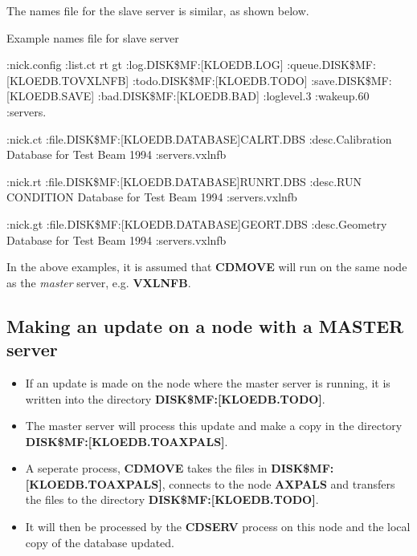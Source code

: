 The names file for the slave server is similar, as shown below.

\begin{XMPt}{Example names file for slave server}

:nick.config
:list.ct rt gt
:log.DISK\$MF:[KLOEDB.LOG]
:queue.DISK\$MF:[KLOEDB.TOVXLNFB]
:todo.DISK\$MF:[KLOEDB.TODO]
:save.DISK\$MF:[KLOEDB.SAVE]
:bad.DISK\$MF:[KLOEDB.BAD]
:loglevel.3
:wakeup.60
:servers.

:nick.ct
:file.DISK\$MF:[KLOEDB.DATABASE]CALRT.DBS
:desc.Calibration Database for Test Beam 1994
:servers.vxlnfb

:nick.rt
:file.DISK\$MF:[KLOEDB.DATABASE]RUNRT.DBS
:desc.RUN CONDITION Database for Test Beam 1994
:servers.vxlnfb

:nick.gt
:file.DISK\$MF:[KLOEDB.DATABASE]GEORT.DBS
:desc.Geometry Database for Test Beam 1994
:servers.vxlnfb

\end{XMPt}

In the above examples, it is assumed that {\bf CDMOVE} will run on the 
same node as the {\it master} server, e.g. {\bf VXLNFB}.

\subsection{Making an update on a node with a {\bf MASTER} server}
\begin{itemize}
\item
If an update is made on the node where the master server is running,
it is written into the directory {\bf DISK\$MF:[KLOEDB.TODO]}. 
\item
The master server will process this update and make a copy in the directory
{\bf DISK\$MF:[KLOEDB.TOAXPALS]}. 
\item
A seperate process, {\bf CDMOVE} takes the files in 
{\bf DISK\$MF:[KLOEDB.TOAXPALS]}, connects to the node {\bf AXPALS}
and transfers the files to the directory
{\bf DISK\$MF:[KLOEDB.TODO]}. 
\item
It will then be processed by the
{\bf CDSERV} process on this node and the local copy of the 
database updated.
\end{itemize}

